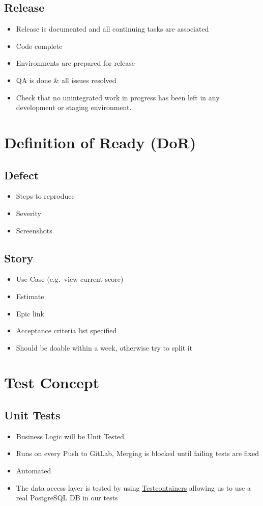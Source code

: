 \subsection{Release}
\begin{itemize}
    \item Release is documented and all continuing tasks are associated 
    \item Code complete 
    \item Environments are prepared for release 
    \item QA is done \& all issues resolved 
    \item Check that no unintegrated work in progress has been left in any development or staging environment. 
\end{itemize}

\section{Definition of Ready (DoR)}

\subsection{Defect} 
\begin{itemize}
    \item Steps to reproduce 
    \item Severity 
    \item Screenshots 
\end{itemize}

\subsection{Story}
\begin{itemize}
    \item Use-Case (e.g.\ view current score)
    \item Estimate 
    \item Epic link 
    \item Acceptance criteria list specified 
    \item Should be doable within a week, otherwise try to split it 
\end{itemize}

\section{Test Concept}
\subsection{Unit Tests}
\begin{itemize}
    \item Business Logic will be Unit Tested
    \item Runs on every Push to GitLab, Merging is blocked until failing tests are fixed
    \item Automated
    \item The data access layer is tested by using \hyperlink{https://www.testcontainers.org/}{Testcontainers} allowing us to use a real PostgreSQL DB in our tests
\end{itemize}

